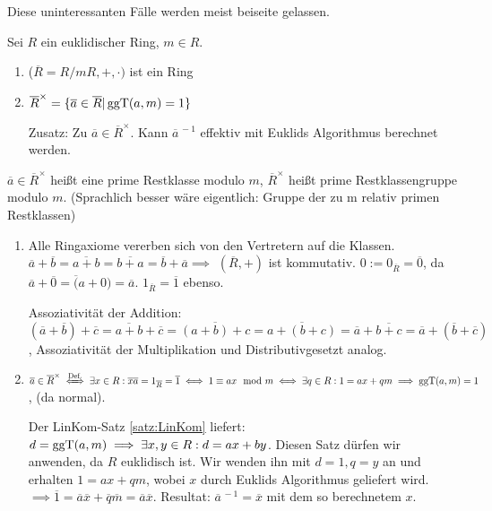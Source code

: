 \documentclass[a4paper,DIV15,BCOR12mm]{article}
\begin{document}
Diese uninteressanten Fälle werden meist beiseite gelassen.

\begin{satz}
Sei $R$ ein euklidischer Ring, $m\in R$.
\begin{enumerate}
\item ($\overline R = R/mR, +, \cdot)$ ist ein Ring
\item $\overline R^\times = \{\overline a \in \overline R| \mathop{\rm ggT}\nolimits(a,m) = 1\}$

Zusatz: Zu $\overline a \in \overline R^\times$. Kann ${\overline
a}^{\,-1}$ effektiv mit Euklids Algorithmus berechnet werden.
\end{enumerate}
\end{satz}

\begin{definition}
$\overline a \in \overline R^\times$ heißt eine prime Restklasse
modulo $m$, $\overline R^\times$ heißt prime Restklassengruppe
modulo $m$. (Sprachlich besser wäre eigentlich: Gruppe der zu m
relativ primen Restklassen)
\end{definition}

\begin{beweis}
\begin{enumerate}
\item Alle Ringaxiome vererben sich von den Vertretern auf die Klassen. $\overline a + \overline b = \overline {a+b} = \overline {b+a} = \overline b + \overline a \implies$ $(\overline R,+)$ ist kommutativ. $0 := 0_{\overline R} = \overline 0$, da $\overline a + \overline 0 = \overline (a+0) = \overline a$. $1_{\overline R} = \overline 1$ ebenso.

Assoziativität der Addition: $(\overline a+ \overline b) + \overline
c = \overline {a+b} + \overline c = \overline {(a+b) +c } =
\overline {a + (b+c)} = \overline a + \overline {b+c} = \overline a
+ (\overline b + \overline c)$, Assoziativität der Multiplikation
und Distributivgesetzt analog.
\item $\overline a \in \overline R^\times \equizunach{Def.} \exists x \in R: \overline x \overline a = 1_{\overline R} = \overline 1 \iff 1 \equiv ax \mod m \iff \exists q \in R: 1 =ax + qm \implies \ggt(a,m)=1$, (da normal).

Der LinKom-Satz \ref{satz:LinKom} liefert: $d=\mathop{\rm ggT}\nolimits(a,m) \implies
\exists x,y\in R: d=ax+by$. Diesen Satz dürfen wir anwenden, da $R$
euklidisch ist. Wir wenden ihn mit $d=1, q=y$ an und erhalten
$1=ax+qm$, wobei $x$ durch Euklids Algorithmus geliefert wird.
$\implies \overline 1 = \overline a \overline x + \overline q
\overline m = \overline a \overline x$. Resultat: $\overline a
^{\,-1} = \overline x$ mit dem so berechnetem $x$.
\end{enumerate}
\end{beweis}
\end{document}
